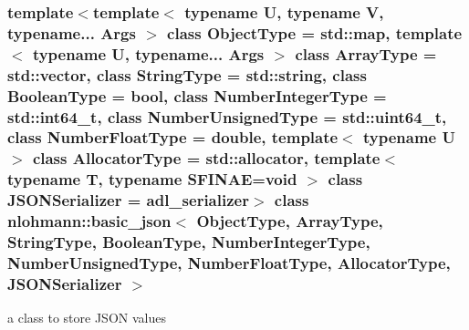 \subsubsection*{template$<$template$<$ typename U, typename V, typename... Args $>$ class Object\+Type = std\+::map, template$<$ typename U, typename... Args $>$ class Array\+Type = std\+::vector, class String\+Type = std\+::string, class Boolean\+Type = bool, class Number\+Integer\+Type = std\+::int64\+\_\+t, class Number\+Unsigned\+Type = std\+::uint64\+\_\+t, class Number\+Float\+Type = double, template$<$ typename U $>$ class Allocator\+Type = std\+::allocator, template$<$ typename T, typename S\+F\+I\+N\+A\+E=void $>$ class J\+S\+O\+N\+Serializer = adl\+\_\+serializer$>$\newline
class nlohmann\+::basic\+\_\+json$<$ Object\+Type, Array\+Type, String\+Type, Boolean\+Type, Number\+Integer\+Type, Number\+Unsigned\+Type, Number\+Float\+Type, Allocator\+Type, J\+S\+O\+N\+Serializer $>$}

a class to store J\+S\+ON values 


